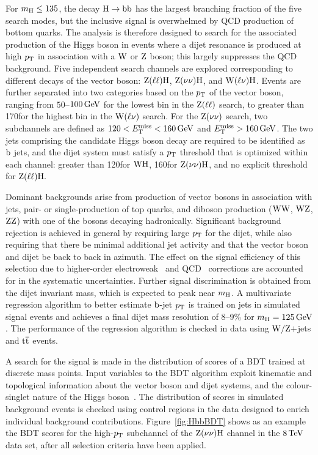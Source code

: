 \documentclass[11pt,twoside,a4paper,cmspaper,final]{cms-tdr}
\begin{document}
For $m_{\mathrm{H}}\leq 135$\GeV, the decay $\mathrm{H}\to\mathrm{b}\mathrm{b}$ has the
largest branching fraction of the five search modes, but the
inclusive signal is overwhelmed by QCD production of bottom quarks.  The analysis
is therefore designed to search for the associated production of the Higgs
boson in events where a dijet resonance is produced at high $p_{\mathrm{T}}$ in association
with a $\mathrm{W}$ or $\mathrm{Z}$ boson; this largely suppresses the QCD background.
Five independent search channels are explored corresponding
to different decays of the vector boson: $\mathrm{Z}(\ell\ell)\mathrm{H}$,
$\mathrm{Z}(\nu\nu)\mathrm{H}$, and $\mathrm{W}(\ell\nu)\mathrm{H}$. Events are further
separated into two categories based on the $p_{\mathrm{T}}$ of the vector boson,
ranging from $50$--$100\,\text{Ge\hspace{-.08em}V}$ for the lowest bin in the $\mathrm{Z}(\ell\ell)$
search, to greater than 170\GeV for the highest bin in the $\mathrm{W}(\ell\nu)$
search.  For the $\mathrm{Z}(\nu\nu)$ search, two subchannels
are defined as $120<E_{\mathrm{T}}^{\text{miss}}<160\,\text{Ge\hspace{-.08em}V}$ and $E_{\mathrm{T}}^{\text{miss}}>160\,\text{Ge\hspace{-.08em}V}$.
The two jets comprising the candidate Higgs
boson decay are required to be identified as $\mathrm{b}$ jets, and the
dijet system must satisfy a $p_{\mathrm{T}}$ threshold that is
optimized within each channel: greater than 120\GeV for $\mathrm{W}\mathrm{H}$,
160\GeV for $\mathrm{Z}(\nu\nu)\mathrm{H}$, and no explicit threshold for $\mathrm{Z}(\ell\ell)\mathrm{H}.$

Dominant backgrounds arise from production of vector bosons in
association with jets, pair- or single-production of top quarks, and
diboson production ($\mathrm{W}\mathrm{W}$, $\mathrm{W}\mathrm{Z}$, $\mathrm{Z}\mathrm{Z}$) with one of
the bosons decaying hadronically.  Significant background rejection
is achieved in general by requiring large $p_{\mathrm{T}}$ for the dijet, while
also requiring that there be minimal additional jet activity and
that the vector boson and dijet be back to back in azimuth.
The effect on the signal efficiency of this selection due to
higher-order electroweak~\cite{Denner:2011id} and
QCD~\cite{Ferrera:2011bk}
corrections are accounted for in the systematic uncertainties.
Further signal discrimination is obtained from the dijet invariant mass,
which is expected to peak near $m_{\mathrm{H}}$.  A multivariate regression
algorithm to better estimate $\mathrm{b}$-jet $p_{\mathrm{T}}$
is trained on jets in simulated signal events and achieves a final
dijet mass resolution of 8--9\% for $m_{\mathrm{H}} = 125\,\text{Ge\hspace{-.08em}V}$.
The performance of the regression algorithm is checked in data
using $\mathrm{W}/\mathrm{Z}+$jets and $\mathrm{t}\overline{\mathrm{t}}$ events.

A search for the signal is made in the distribution of scores of a BDT trained at
discrete mass points.  Input variables to the BDT algorithm exploit
kinematic and topological information about the vector boson and dijet
systems, and the colour-singlet nature of the Higgs boson~\cite{Gallicchio:2010sw}.  The
distribution of scores in simulated background events is checked using control regions in the data designed
to enrich individual background contributions.
Figure~\ref{fig:HbbBDT} shows as an example the BDT scores for the high-$p_{\mathrm{T}}$ subchannel of the $\mathrm{Z}(\nu\nu)\mathrm{H}$ channel in the $8\,\text{Te\hspace{-.08em}V}$ data set, after all selection criteria have been applied.
\end{document}
